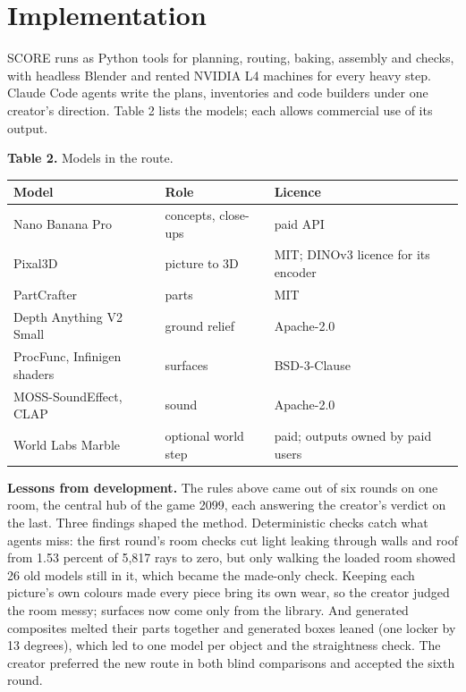 \section{Implementation}\label{implementation}

SCORE runs as Python tools for planning, routing, baking, assembly and checks, with headless Blender \citep{blender} and rented NVIDIA L4 machines for every heavy step. Claude Code agents \citep{claudecode} write the plans, inventories and code builders under one creator's direction. Table 2 lists the models; each allows commercial use of its output.

\textbf{Table 2.} Models in the route.

{\def\LTcaptype{none} %
\begin{longtable}[]{@{}
  >{\raggedright\arraybackslash}p{}
  >{\raggedright\arraybackslash}p{}
  >{\raggedright\arraybackslash}p{}@{}}
\toprule\noalign{}
\begin{minipage}[b]{\linewidth}\raggedright
Model
\end{minipage} & \begin{minipage}[b]{\linewidth}\raggedright
Role
\end{minipage} & \begin{minipage}[b]{\linewidth}\raggedright
Licence
\end{minipage} \\
\midrule\noalign{}
\endhead
\bottomrule\noalign{}
\endlastfoot
Nano Banana Pro \citep{nanobananapro} & concepts, close-ups & paid API \\
Pixal3D \citep{li2026pixal3d} & picture to 3D & MIT; DINOv3 licence for its encoder \\
PartCrafter \citep{lin2025partcrafter} & parts & MIT \\
Depth Anything V2 Small \citep{yang2024dav2} & ground relief & Apache-2.0 \\
ProcFunc, Infinigen shaders & surfaces & BSD-3-Clause \\
MOSS-SoundEffect, CLAP & sound & Apache-2.0 \\
World Labs Marble \citep{marble_terms} & optional world step & paid; outputs owned by paid users \\
\end{longtable}
}

\textbf{Lessons from development.} The rules above came out of six rounds on one room, the central hub of the game 2099, each answering the creator's verdict on the last. Three findings shaped the method. Deterministic checks catch what agents miss: the first round's room checks cut light leaking through walls and roof from 1.53 percent of 5,817 rays to zero, but only walking the loaded room showed 26 old models still in it, which became the made-only check. Keeping each picture's own colours made every piece bring its own wear, so the creator judged the room messy; surfaces now come only from the library. And generated composites melted their parts together and generated boxes leaned (one locker by 13 degrees), which led to one model per object and the straightness check. The creator preferred the new route in both blind comparisons and accepted the sixth round.

